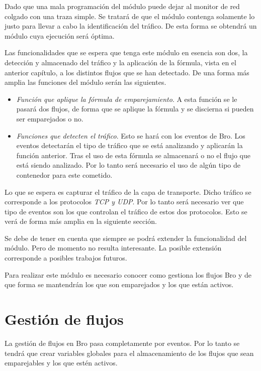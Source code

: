 Dado que una mala programación del módulo puede dejar al monitor de red colgado con una traza simple. Se tratará de 
que el módulo contenga solamente lo justo para llevar a cabo la identificación del tráfico. De esta forma se 
obtendrá un módulo cuya ejecución será óptima. 

\intro Las funcionalidades que se espera que tenga este módulo en esencia son dos, la detección y almacenado 
del tráfico y la aplicación de la fórmula, vista en el anterior capítulo, a los distintos flujos que se han 
detectado. De una forma más amplia las funciones del módulo serán las siguientes. 

\begin{itemize}
\item \textit{Función que aplique la fórmula de emparejamiento}. 
\intro A esta función se le pasará dos flujos, de forma que se aplique la fórmula y se discierna si pueden 
ser emparejados o no.
\item \textit{Funciones que detecten el tráfico}. 
\intro Esto se hará con los eventos de Bro. Los eventos detectarán el tipo de tráfico que se está analizando 
y aplicarán la función anterior.
\intro Tras el uso de esta fórmula se almacenará o no el flujo que está siendo analizado. Por lo tanto 
será necesario el uso de algún tipo de contenedor para este cometido.
\end{itemize}

\intro Lo que se espera es capturar el tráfico de la capa de transporte. Dicho tráfico se corresponde a los 
protocolos \textit{TCP y UDP}. Por lo tanto será necesario ver que tipo de eventos son los que controlan el tráfico 
de estos dos protocolos. Esto se verá de forma más amplia en la siguiente sección.

\intro Se debe de tener en cuenta que siempre se podrá extender la funcionalidad del módulo. Pero de momento no 
resulta interesante. La posible extensión corresponde a posibles trabajos futuros.

\intro Para realizar este módulo es necesario conocer como gestiona los flujos Bro y de que forma se mantendrán 
los que son emparejados y los que están activos.

\section{Gestión de flujos}

La gestión de flujos en Bro pasa completamente por eventos. Por lo tanto se tendrá que crear variables globales 
para el almacenamiento de los flujos que sean emparejables y los que estén activos.

